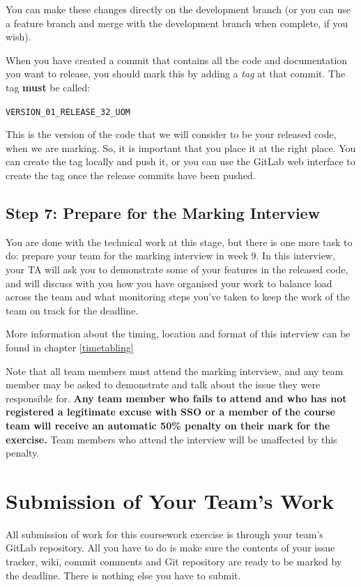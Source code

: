 \documentclass[
]{book}
\begin{document}
You can make these changes directly on the development branch (or you can use a feature branch and merge with the development branch when complete, if you wish).

When you have created a commit that contains all the code and documentation you want to release, you should mark this by adding a \emph{tag} at that commit. The tag \textbf{must} be called:

\texttt{VERSION\_01\_RELEASE\_32\_UOM}

This is the version of the code that we will consider to be your released code, when we are marking. So, it is important that you place it at the right place. You can create the tag locally and push it, or you can use the GitLab web interface to create the tag once the release commits have been pushed.

\hypertarget{interviewprep}{%
\subsection{Step 7: Prepare for the Marking Interview}\label{interviewprep}}

You are done with the technical work at this stage, but there is one more task to do: prepare your team for the marking interview in week 9. In this interview, your TA will ask you to demonstrate some of your features in the released code, and will discuss with you how you have organised your work to balance load across the team and what monitoring steps you've taken to keep the work of the team on track for the deadline.

More information about the timing, location and format of this interview can be found in chapter \ref{timetabling}

Note that all team members must attend the marking interview, and any team member may be asked to demonstrate and talk about the issue they were responsible for. \textbf{Any team member who fails to attend and who has not registered a legitimate excuse with SSO or a member of the course team will receive an automatic 50\% penalty on their mark for the exercise.} Team members who attend the interview will be unaffected by this penalty.

\hypertarget{teamsubmit}{%
\section{Submission of Your Team's Work}\label{teamsubmit}}

All submission of work for this coursework exercise is through your team's GitLab repository. All you have to do is make sure the contents of your issue tracker, wiki, commit comments and Git repository are ready to be marked by the deadline. There is nothing else you have to submit.
\end{document}
